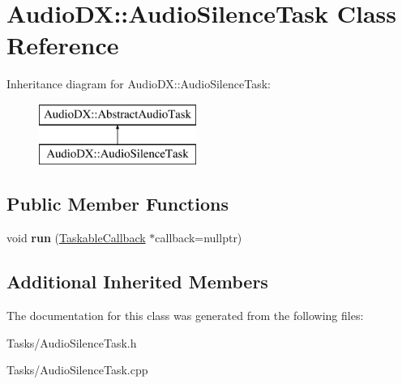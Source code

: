 \hypertarget{class_audio_d_x_1_1_audio_silence_task}{\section{Audio\-D\-X\-:\-:Audio\-Silence\-Task Class Reference}
\label{class_audio_d_x_1_1_audio_silence_task}
}
Inheritance diagram for Audio\-D\-X\-:\-:Audio\-Silence\-Task\-:\begin{figure}[H]
\begin{center}
\leavevmode
\includegraphics[height=2.000000cm]{class_audio_d_x_1_1_audio_silence_task}
\end{center}
\end{figure}
\subsection*{Public Member Functions}
\begin{DoxyCompactItemize}
\item 
\hypertarget{class_audio_d_x_1_1_audio_silence_task_a2365eef397d04ed2681a331b6d1baf3d}{void {\bfseries run} (\hyperlink{class_taskable_callback}{Taskable\-Callback} $\ast$callback=nullptr)}\label{class_audio_d_x_1_1_audio_silence_task_a2365eef397d04ed2681a331b6d1baf3d}

\end{DoxyCompactItemize}
\subsection*{Additional Inherited Members}


The documentation for this class was generated from the following files\-:\begin{DoxyCompactItemize}
\item 
Tasks/Audio\-Silence\-Task.\-h\item 
Tasks/Audio\-Silence\-Task.\-cpp\end{DoxyCompactItemize}

